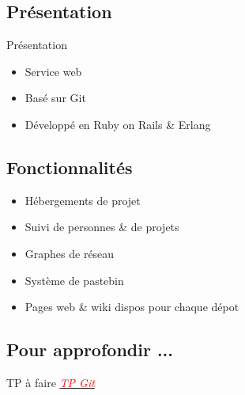 \begin{frame}
	\sectionpage
\end{frame}

\subsection{Présentation}
	\begin{frame}{Présentation}
		\begin{itemize}[<+->]
			\item Service web
			\item Basé sur Git
			\item Développé en Ruby on Rails \& Erlang
		\end{itemize}
	\end{frame}

\subsection{Fonctionnalités}
	\begin{frame}
		\begin{itemize}[<+->]
			\item Hébergements de projet
			\item Suivi de personnes \& de projets
			\item Graphes de réseau
			\item Système de pastebin
			\item Pages web \& wiki dispos pour chaque dépot
		\end{itemize}
	\end{frame}
	
\subsection{Pour approfondir ...}
	\begin{frame}
		\begin{block}{TP à faire}
			\href{http://bit.ly/iut-3}{\textit{\textcolor{red}{TP Git}}}
		\end{block}
	\end{frame}

